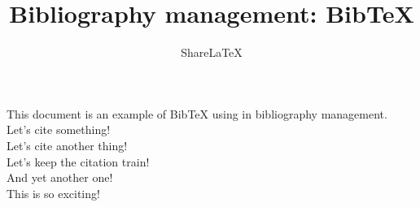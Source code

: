 \documentclass[a4paper,10pt]{article}
\title{Bibliography management: BibTeX}
\author{Share\LaTeX}
\begin{document}
\maketitle
This document is an example of BibTeX using in bibliography management.\\
Let's cite something! \cite{sturmfels_algorithms_2008}\\
Let's cite another thing! \cite{derksen_polynomial_2000}\\
Let's keep the citation train! \cite{gao_zero-sum_2006} \\
And yet another one! \cite{sezer_sharpening_2002} \\
This is so exciting! \cite{schmid_finite_1991}

\medskip


\end{document}
